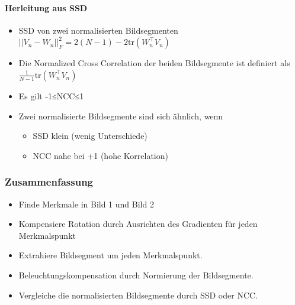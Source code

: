 \documentclass[12pt, a4paper, oneside]{article}
\begin{document}
\paragraph*{Herleitung aus SSD}
\begin{itemize}
  \item SSD von zwei normalisierten Bildsegmenten $||V_n-W_n||_F^2=2(N-1)-2\text{tr}(W_n^\top V_n)$
  \item Die Normalized Cross Correlation der beiden Bildsegmente ist definiert als $\frac{1}{N-1}\text{tr}(W_n^\top V_n)$
  \item Es gilt -1≤NCC≤1
  \item Zwei normalisierte Bildsegmente sind sich ähnlich, wenn
  \begin{itemize}
      \item SSD klein (wenig Unterschiede)
      \item NCC nahe bei +1 (hohe Korrelation)
  \end{itemize}
\end{itemize}

\subsubsection{Zusammenfassung}

\begin{itemize}
  \item Finde Merkmale in Bild 1 und Bild 2
  \item Kompensiere Rotation durch Ausrichten des Gradienten für jeden Merkmalspunkt
  \item Extrahiere Bildsegment um jeden Merkmalspunkt.
  \item Beleuchtungskompensation durch Normierung der Bildsegmente.
  \item Vergleiche die normalisierten Bildsegmente durch SSD oder NCC.
\end{itemize}
\end{document}
